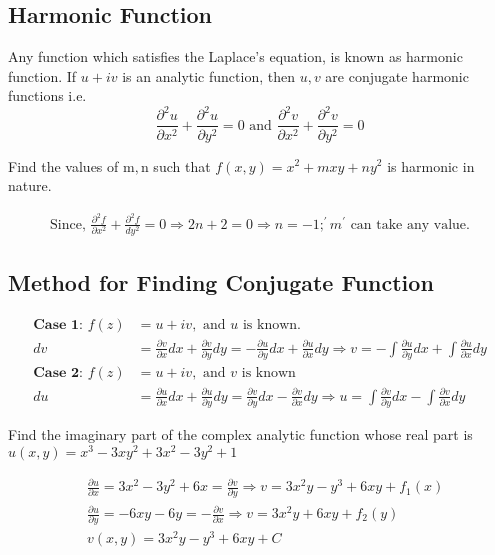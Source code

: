 	\subsection{Harmonic Function}
	Any function which satisfies the Laplace's equation, is known as harmonic function. If $u+i v$ is an analytic function, then $u, v$ are conjugate harmonic functions i.e.
	$$
	\frac{\partial^{2} u}{\partial x^{2}}+\frac{\partial^{2} u}{\partial y^{2}}=0 \text { and } \frac{\partial^{2} v}{\partial x^{2}}+\frac{\partial^{2} v}{\partial y^{2}}=0
	$$
	\begin{exercise}
		Find the values of $\mathrm{m}, \mathrm{n}$ such that $f(x, y)=x^{2}+m x y+n y^{2}$ is harmonic in nature.
	\end{exercise}
	\begin{answer}
		\begin{align*}
		\text { Since, } \frac{\partial^{2} f}{\partial x^{2}}+\frac{\partial^{2} f}{d y^{2}}=0 \Rightarrow 2 n+2=0 \Rightarrow n=-1 ;^{\prime} m^{\prime} \text { can take any value. }
		\end{align*}
	\end{answer}
	\subsection{Method for Finding Conjugate Function }
		\begin{align*}
		\textbf{Case 1: }f(z)&=u+i v,\text{ and $u$ is known.}\\
		d v&=\frac{\partial v}{\partial x} d x+\frac{\partial v}{\partial y} d y=-\frac{\partial u}{\partial y} d x+\frac{\partial u}{\partial x} d y \Rightarrow v=-\int \frac{\partial u}{\partial y} d x+\int \frac{\partial u}{\partial x} d y\\
		\textbf{Case 2: }f(z)&=u+i v,\text{ and $v$ is known}\\
		d u&=\frac{\partial u}{\partial x} d x+\frac{\partial u}{\partial y} d y=\frac{\partial v}{\partial y} d x-\frac{\partial v}{\partial x} d y \Rightarrow u=\int \frac{\partial v}{\partial y} d x-\int \frac{\partial v}{\partial x} d y
		\end{align*}
	\begin{exercise}
		 Find the imaginary part of the complex analytic function whose real part is $u(x, y)=x^{3}-3 x y^{2}+3 x^{2}-3 y^{2}+1$
	\end{exercise}
	\begin{answer}
		\begin{align*}
		&\frac{\partial u}{\partial x}=3 x^{2}-3 y^{2}+6 x=\frac{\partial v}{\partial y} \Rightarrow v=3 x^{2} y-y^{3}+6 x y+f_{1}(x) \\
		&\frac{\partial u}{\partial y}=-6 x y-6 y=-\frac{\partial v}{\partial x} \Rightarrow v=3 x^{2} y+6 x y+f_{2}(y) \\
		&v(x, y)=3 x^{2} y-y^{3}+6 x y+C
		\end{align*}
	\end{answer}
